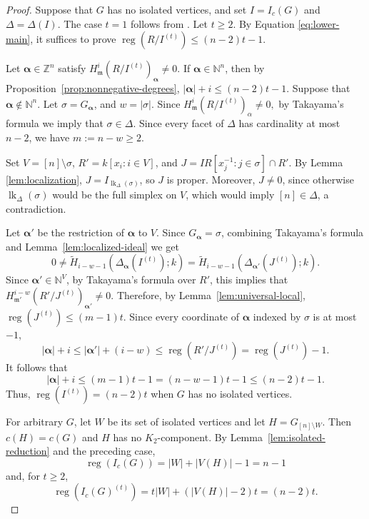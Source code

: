 \documentclass[12pt]{amsart}
\DeclareMathOperator{\reg}{reg}
\begin{document}
\begin{proof}
Suppose that \(G\) has no isolated vertices, and set \(I=I_c(G)\) and \(\Delta=\Delta(I)\). The case $t=1$ follows from \cite[Theorem~4.1]{fm25}. Let $t\ge2$. By Equation \eqref{eq:lower-main}, it suffices to prove $\reg(R/I^{(t)})\le(n-2)t-1$.

Let $\boldsymbol\alpha\in\mathbb Z^n$ satisfy $H_{\mathfrak m}^i(R/I^{(t)})_{\boldsymbol\alpha}\ne0.$ If $\boldsymbol\alpha\in\mathbb N^n$, then by Proposition~\ref{prop:nonnegative-degrees}, $|\boldsymbol\alpha|+i\le(n-2)t-1$. Suppose that $\boldsymbol\alpha\notin\mathbb N^n$. Let $\sigma=G_{\boldsymbol\alpha}$, and $w=|\sigma|$.  Since \(H^i_{\mathfrak m}(R/I^{(t)})_\alpha\neq0,\) by Takayama's formula we imply that $\sigma\in\Delta$. Since every facet of $\Delta$ has cardinality at most $n-2$, we have $m:=n-w\ge2$.


Set $V=[n]\setminus\sigma$, $R'=k[x_i:i\in V]$, and \(J=IR[x_j^{-1}:j\in\sigma]\cap R' \). By Lemma \ref{lem:localization}, \(J=I_{\operatorname{lk}_\Delta(\sigma)} \), so $J$ is proper. Moreover, $J\neq0$, since otherwise $\operatorname{lk}_\Delta(\sigma)$ would be the full simplex on $V$, which would imply $[n]\in\Delta$, a contradiction.


Let $\boldsymbol{\alpha}'$ be the restriction of $\boldsymbol{\alpha}$ to $V$. Since \(G_{\boldsymbol{\alpha}}=\sigma\), combining Takayama's formula and
Lemma~\ref{lem:localized-ideal} we get
\[
0\neq
\widetilde H_{i-w-1}
\left(
\Delta_{\boldsymbol{\alpha}}(I^{(t)});k
\right)
=
\widetilde H_{i-w-1}
\left(
\Delta_{\boldsymbol{\alpha}'}(J^{(t)});k
\right).
\]
Since \(\boldsymbol{\alpha}'\in\mathbb N^V\), by Takayama's
formula over \(R'\), this implies that $H^{i-w}_{\mathfrak m'}
\left(R'/J^{(t)}\right)_{\boldsymbol{\alpha}'}
\neq 0.$
Therefore, by Lemma~\ref{lem:universal-local}, $\reg(J^{(t)})\le(m-1)t$. Since every coordinate of $\boldsymbol\alpha$ indexed by $\sigma$ is at most $-1$,
\[
|\boldsymbol\alpha|+i\le|\boldsymbol\alpha'|+(i-w)\le\reg(R'/J^{(t)})=\reg(J^{(t)})-1.
\]
It follows that
\[
|\boldsymbol\alpha|+i\le(m-1)t-1=(n-w-1)t-1\le(n-2)t-1.
\]
Thus, $\reg(I^{(t)})=(n-2)t$ when $G$ has no isolated vertices.

For arbitrary $G$, let $W$ be its set of isolated vertices and let $H=G_{[n]\setminus W}$. Then $c(H)=c(G)$ and $H$ has no $K_2$-component. By Lemma~\ref{lem:isolated-reduction} and the preceding case,
\[
\reg(I_c(G))=|W|+|V(H)|-1=n-1
\]
and, for $t\ge2$,
\[
\reg(I_c(G)^{(t)})=t|W|+(|V(H)|-2)t=(n-2)t.
\]
\end{proof}
\end{document}
